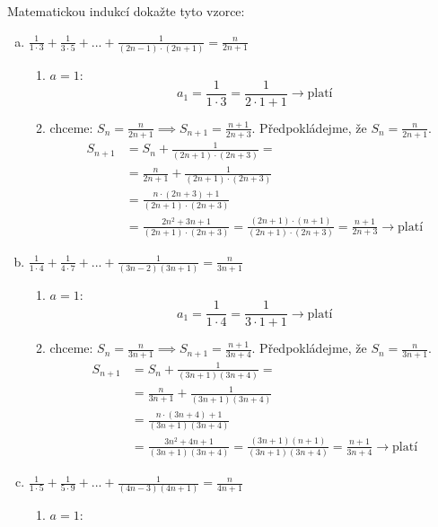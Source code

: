 \begin{example}[SÚM 242/18]
  Matematickou indukcí dokažte tyto vzorce:
\begin{enumerate}[a.]
  \item $\frac{1}{1\cdot3}+\frac{1}{3\cdot5}+...+\frac{1}{(2n-1)\cdot(2n+1)} = \frac{n}{2n+1}$
    \begin{enumerate}[$i.$]
      \item $a = 1:$
      $$a_1 = \frac{1}{1\cdot3} = \frac{1}{2\cdot1 + 1}\rightarrow \textrm{platí}$$
      \item chceme: $S_n = \frac{n}{2n+1} \implies S_{n+1} = \frac{n+1}{2n+3}$. Předpokládejme, že $S_n = \frac{n}{2n+1}$.
      \begin{align*}
        S_{n+1} & = S_n + \frac{1}{(2n+1)\cdot(2n+3)} = \\
        & = \frac{n}{2n+1} + \frac{1}{(2n+1)\cdot(2n+3)}\\
        &= \frac{n\cdot(2n+3)+1}{(2n+1)\cdot(2n+3)}\\
        &= \frac{2n^2+3n+1}{(2n+1)\cdot(2n+3)} = \frac{(2n+1)\cdot(n+1)}{(2n+1)\cdot(2n+3)} = \frac{n+1}{2n+3} \rightarrow \textrm{platí}
      \end{align*}
    \end{enumerate}
  \item $\frac{1}{1\cdot4} + \frac{1}{4\cdot7}+...+\frac{1}{(3n-2)(3n+1)} = \frac{n}{3n+1}$
    \begin{enumerate}[$i.$]
      \item $a = 1:$
      $$a_1 = \frac{1}{1\cdot4} = \frac{1}{3\cdot1 + 1}\rightarrow  \textrm{platí}$$
      \item chceme: $S_n = \frac{n}{3n+1} \implies S_{n+1} = \frac{n+1}{3n+4}$. Předpokládejme, že $S_n = \frac{n}{3n+1}$.
      \begin{align*}
        S_{n+1} & = S_n + \frac{1}{(3n+1)(3n+4)} = \\
        & = \frac{n}{3n+1} + \frac{1}{(3n+1)(3n+4)}\\
        &= \frac{n\cdot(3n+4)+1}{(3n+1)(3n+4)}\\
        &= \frac{3n^2+4n+1}{(3n+1)(3n+4)} = \frac{(3n+1)(n+1)}{(3n+1)(3n+4)} = \frac{n+1}{3n+4} \rightarrow \textrm{platí}
      \end{align*}
    \end{enumerate}
  \item $\frac{1}{1\cdot 5}+ \frac{1}{5\cdot9}+...+\frac{1}{(4n-3)(4n+1)} = \frac{n}{4n+1}$
    \begin{enumerate}[$i.$]
      \item $a = 1:$

\end{enumerate}
\end{enumerate}
\end{example}
